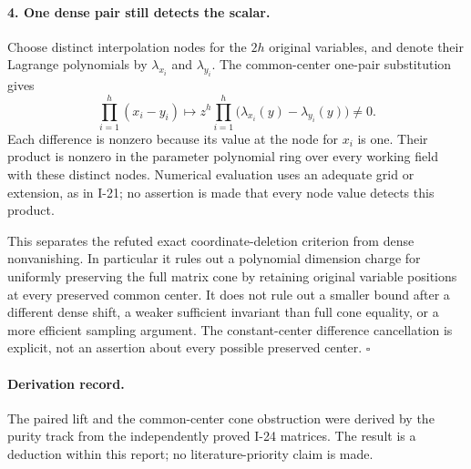 \paragraph{4. One dense pair still detects the scalar.}
Choose distinct interpolation nodes for the $2h$ original
variables, and denote their Lagrange polynomials by
$\lambda_{x_i}$ and $\lambda_{y_i}$. The common-center
one-pair substitution gives
\[
 \prod_{i=1}^h(x_i-y_i)
   \longmapsto
 z^h\prod_{i=1}^h
       \bigl(\lambda_{x_i}(y)-\lambda_{y_i}(y)\bigr)\ne0.
 \tag{I.61}
\]
Each difference is nonzero because its value at the node
for $x_i$ is one. Their product is nonzero in the parameter
polynomial ring over every working field with these distinct
nodes. Numerical evaluation uses an adequate grid or extension,
as in I-21; no assertion is made that every node value detects
this product.

This separates the refuted exact coordinate-deletion criterion
from dense nonvanishing. In particular it rules out a polynomial
dimension charge for uniformly preserving the full matrix cone
by retaining original variable positions at every preserved
common center. It does not rule out a smaller bound after a
different dense shift, a weaker sufficient invariant than full
cone equality, or a more efficient sampling argument. The
constant-center difference cancellation is explicit, not an
assertion about every possible preserved center. $\square$

\paragraph{Derivation record.}
The paired lift and the common-center cone obstruction were
derived by the purity track from the independently proved
I-24 matrices. The result is a deduction within this report;
no literature-priority claim is made.
